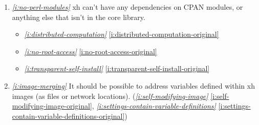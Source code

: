 \documentclass{report}
\makeatletter
\newcommand*{\Label}[2]{%
  \@bsphack
  \begingroup
    \label{#1-original}%
    \def\@currentlabel{#2}%
    \label{#1}%
  \endgroup
  \@esphack
}
\newcommand{\refboth}[1]{{\em \ref{#1}} \ref{#1-original}}
\makeatother
\begin{document}
\begin{enumerate}
\begin{itemize}
\item \refboth{i:www-initialization}
\item \refboth{i:self-modifying-image}
\end{itemize}
\item{}\Label{i:no-perl-modules}{perlcoreonly}{\em\ref{i:no-perl-modules}}
  xh can't have any dependencies on CPAN modules, or anything else that
  isn't in the core library.
\begin{itemize}
\item \refboth{i:distributed-computation}
\item \refboth{i:no-root-access}
\item \refboth{i:transparent-self-install}
\end{itemize}
\item{}\Label{i:image-merging}{imagemerging}{\em\ref{i:image-merging}}
  It should be possible to address variables defined within xh images (as
  files or network locations).
(\refboth{i:self-modifying-image}, \refboth{i:settings-contain-variable-definitions})


\end{enumerate}
\end{document}
